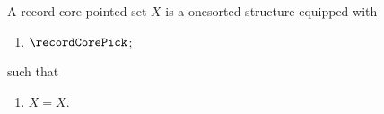 \begin{struct}\label{record_core_pointed_set}
    A record-core pointed set $X$ is a onesorted structure equipped with
    \begin{enumerate}
        \item $\recordCorePick$;
    \end{enumerate}
    such that
    \begin{enumerate}
        \item\label{record_core_refl} $X = X$.
    \end{enumerate}
\end{struct}
